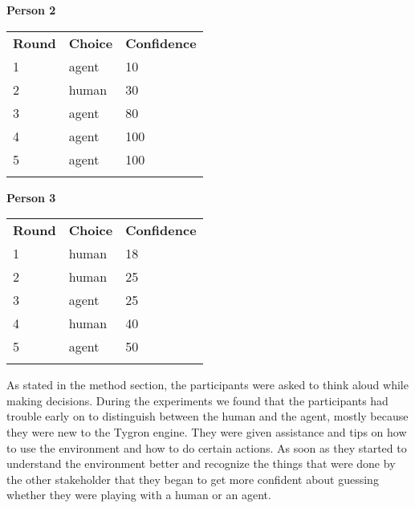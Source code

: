 \textbf{Person 2}
\begin{tabular}{lll}
\textbf{Round} & \textbf{Choice}  & \textbf{Confidence}\\ 
1 & agent  & 10        \\
2 & human  & 30         \\
3 & agent  & 80         \\
4 & agent  & 100         \\
5 & agent  & 100       \\\\
\end{tabular}

\textbf{Person 3}
\begin{tabular}{lll}
\textbf{Round} & \textbf{Choice}  & \textbf{Confidence}\\ 
1 & human  & 18         \\
2 & human  & 25         \\
3 & agent  & 25         \\
4 & human  & 40         \\
5 & agent  & 50        \\\\
\end{tabular}

As stated in the method section, the participants were asked to think aloud while making decisions. During the experiments we found that the participants had trouble early on to distinguish between the human and the agent, mostly because they were new to the Tygron engine. They were given assistance and tips on how to use the environment and how to do certain actions. As soon as they started to understand the environment better and recognize the things that were done by the other stakeholder that they began to get more confident about guessing whether they were playing with a human or an agent.

